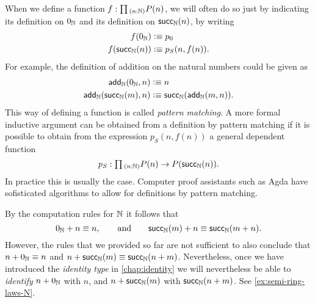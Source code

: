 \begin{rmk}
  When we define a function $f:\prd{n:\N} P(n)$, we will often do so just by indicating its definition on $0_{{\mathbb{N}}}$ and its definition on $\mathsf{succ}_{{\mathbb{N}}}(n)$, by writing
  \begin{align*}
    f(0_{{\mathbb{N}}}) & \vcentcolon\equiv p_0 \\
    f(\mathsf{succ}_{{\mathbb{N}}}(n)) & \vcentcolon\equiv p_S(n,f(n)).
  \end{align*}
  For example, the definition of addition on the natural numbers could be given as
  \begin{align*}
    \mathsf{add_{{\mathbb{N}}}}(0_{{\mathbb{N}}},n) & \vcentcolon\equiv n \\
    \mathsf{add_{{\mathbb{N}}}}(\mathsf{succ}_{{\mathbb{N}}}(m),n) & \vcentcolon\equiv \mathsf{succ}_{{\mathbb{N}}}(\mathsf{add_{{\mathbb{N}}}}(m,n)).
  \end{align*}
  This way of defining a function is called \emph{pattern matching}. A more formal inductive argument can be obtained from a definition by pattern matching if it is possible to obtain from the expression $p_S(n,f(n))$ a general dependent function
  \begin{equation*}
    p_S : \prd{n:\N} P(n)\to P(\succN(n)).
  \end{equation*}
  In practice this is usually the case. Computer proof assistants such as Agda have sofisticated algorithms to allow for definitions by pattern matching.
\end{rmk}

\begin{rmk}
  By the computation rules for ${\mathbb{N}}$ it follows that
  \begin{equation*}
    0_{{\mathbb{N}}}+n\equiv n,\qquad\text{and}\qquad \mathsf{succ}_{{\mathbb{N}}}(m)+n\equiv\mathsf{succ}_{{\mathbb{N}}}(m+n).
  \end{equation*}
  However, the rules that we provided so far are not sufficient to also conclude that $n+0_{{\mathbb{N}}}\equiv n$ and $n+ \mathsf{succ}_{{\mathbb{N}}}(m)\equiv \mathsf{succ}_{{\mathbb{N}}}(n+m)$. Nevertheless, once we have introduced the \emph{identity type} in \cref{chap:identity} we will nevertheless be able to \emph{identify} $n+0_{{\mathbb{N}}}$ with $n$, and $n+ \mathsf{succ}_{{\mathbb{N}}}(m)$ with $\mathsf{succ}_{{\mathbb{N}}}(n+m)$. See \cref{ex:semi-ring-laws-N}. 
\end{rmk}

